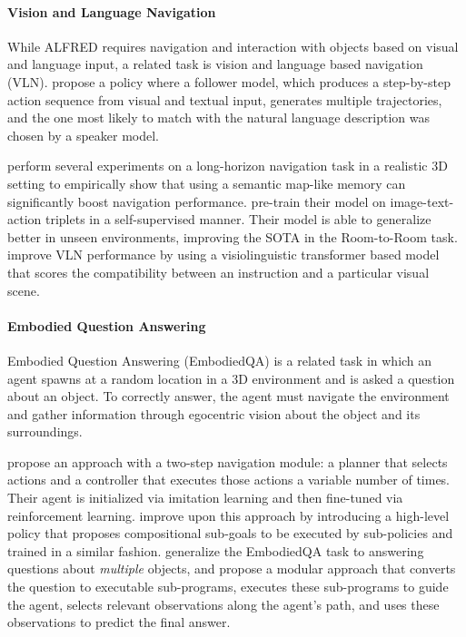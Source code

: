 \documentclass[11pt,a4paper]{article}
\begin{document}
\paragraph{Vision and Language Navigation}
\label{ssec:vln}
While ALFRED requires navigation and interaction with objects based on visual and language input, a related task is vision and language based navigation (VLN).  propose a policy where a follower model, which produces a step-by-step action sequence from visual and textual input, generates multiple trajectories, and the one most likely to match with the natural language description was chosen by a speaker model.

 perform several experiments on a long-horizon navigation task in a realistic 3D setting to empirically show that using a semantic map-like memory can significantly boost navigation performance.  pre-train their model on image-text-action triplets in a self-supervised manner. Their model is able to generalize better in unseen environments, improving the SOTA in the Room-to-Room task.  improve VLN performance by using a visiolinguistic transformer based model that scores the compatibility between an instruction and a particular visual scene. 

\paragraph{Embodied Question Answering}
\label{ssec:eqa}
Embodied Question Answering \cite{Das2018EmbodiedQA} (EmbodiedQA) is a related task in which an agent spawns at a random location in a 3D environment and is asked a question about an object. To correctly answer, the agent must navigate the environment and gather information through egocentric vision about the object and its surroundings. 

 propose an approach with a two-step navigation module: a planner that selects actions and a controller that executes those actions a variable number of times. Their agent is initialized via imitation learning and then fine-tuned via reinforcement learning.  improve upon this approach by introducing a high-level policy that proposes compositional sub-goals to be executed by sub-policies and trained in a similar fashion.  generalize the EmbodiedQA task to answering questions about \textit{multiple} objects, and propose a modular approach that converts the question to executable sub-programs, executes these sub-programs to guide the agent, selects relevant observations along the agent's path, and uses these observations to predict the final answer.
\end{document}
